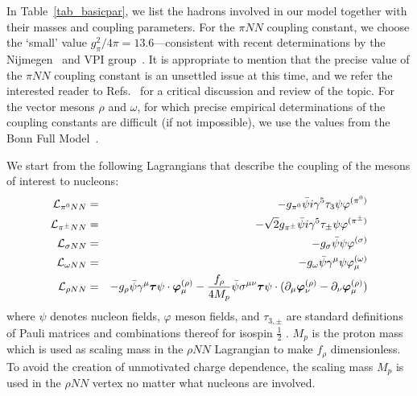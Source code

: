 In Table~\ref{tab_basicpar}, we list the hadrons involved in our model 
together with their masses and coupling parameters.
For the $\pi NN$ coupling constant, we choose the `small' value
$g_\pi^2/4\pi=13.6$---consistent
with recent determinations by the Nijmegen~\cite{STS93,Tim95}
 and VPI group~\cite{ASW94,AWP94,Pav99}. It is appropriate 
to mention that the precise value of the $\pi NN$ coupling
constant is an unsettled issue at this time, 
and we refer the interested
reader to Refs.~\cite{Mac99,MB99} for a critical discussion
and review of the topic.
For the vector mesons $\rho$ and $\omega$, for which precise
empirical determinations of the coupling constants are difficult
(if not impossible), we use the values from the 
Bonn Full Model~\cite{MHE87}.

We start from the following
Lagrangians that describe the coupling of the mesons of interest
to nucleons:
\begin{eqnarray}
{\cal L}_{\pi^0 NN}&=& - g_{\pi^0} \bar{\psi} i\gamma^{5} 
                           \tau_3 \psi
                           \varphi^{(\pi^0)}
\label{eq_pi0NN}
\\
{\cal L}_{\pi^\pm NN}&=& - \sqrt{2} g_{\pi^\pm} \bar{\psi} i\gamma^{5} 
                           \tau_\pm \psi
                           \varphi^{(\pi^\pm)}
\label{eq_pipmNN}
\\
{\cal L}_{\sigma NN}&=& -g_{\sigma}\bar{\psi}\psi\varphi^{(\sigma)}
\label{eq_sigmaNN}
\\
{\cal L}_{\omega NN}&=& -g_{\omega}\bar{\psi}\gamma^{\mu}\psi
                       \varphi^{(\omega)}_{\mu}
\label{eq_omegaNN}
\\
{\cal L}_{\rho NN} &=& -g_{\rho}
                           \bar{\psi}  \gamma^\mu  
                           \mbox{\boldmath $\tau$} \psi
                           \cdot 
                           \mbox{\boldmath $\varphi$}^{(\rho)}_\mu
                  - \frac{f_\rho}{4M_p}
                           \bar{\psi}  \sigma^{\mu\nu}  
                           \mbox{\boldmath $\tau$} \psi
                           \cdot 
                           (\partial_\mu
                           \mbox{\boldmath $\varphi$}^{(\rho)}_\nu
                           -\partial_\nu
                           \mbox{\boldmath $\varphi$}^{(\rho)}_\mu)
\label{eq_rhoNN}
\end{eqnarray}
where
$\psi$ denotes nucleon fields, $\varphi$ meson fields, and
$\tau_{3,\pm}$ are standard definitions of Pauli matrices  and
combinations thereof for isospin $\frac12$ \cite{BD64}.
$M_p$ is the proton mass which is used as scaling mass in the $\rho NN$
Lagrangian to make $f_\rho$ dimensionless. To avoid the creation
of unmotivated charge dependence, the scaling mass $M_p$ is
used in the $\rho NN$ vertex no matter what nucleons are involved.

